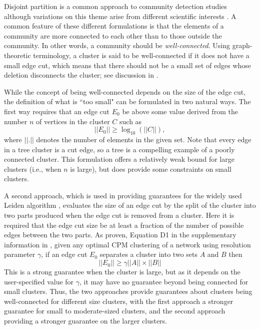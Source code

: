 \documentclass[12pt, oneside]{article}   	%
\begin{document}
Disjoint partition is a  common approach to community detection studies \citep{Fortunato2022,Fortunato2010} although variations on this theme arise from different scientific interests \citep{Coscia2011,Schaub2017}. 
A common feature of these different formulations is that  the elements of a community are more connected to each other than to those outside the community. In other words, a community 
should be {\em well-connected}. Using graph-theoretic terminology, a cluster is said to be well-connected if it does not have a small edge cut, which means that there should not be a small set of edges whose deletion 
disconnects the cluster; see discussion in \cite{Traag_2019}. 

While the concept of being well-connected depends on the size of the edge cut, the definition of what is ``too small" can be formulated in two
natural ways.
The first way
requires that an edge cut  $E_0$ be above some value derived from the number $n$ of 
vertices in the cluster $C$ such as $$||E_0|| \geq \log_{10}(||C||),$$    where $||.||$ denotes the number of elements in the given set.
Note that every edge in  a tree cluster is a cut edge, so a tree is  a compelling example of a poorly connected cluster. 
This formulation offers a relatively weak bound for large clusters (i.e., when   $n$ is large), but does provide some constraints on small clusters. 

A second approach, which is used in providing guarantees for the widely used Leiden algorithm \citep{Traag_2019}, evaluates the size of an edge cut by the split  of the cluster into two parts produced 
when the edge cut is removed from a cluster. Here it is required that the edge cut size be at least a fraction of the number of possible edges between the two  parts.
As proven, Equation D1 in the supplementary information in \cite{Traag_2019}, given any optimal CPM clustering of a network using resolution parameter $\gamma$, if an edge cut $E_0$
separates a cluster into two sets $A$ and $B$ then $$||E_0|| \geq \gamma ||A|| \times ||B||$$ This is a strong guarantee when the cluster is large,  but as it depends on the user-specified value for $\gamma$, it 
may have no guarantee  beyond being connected for small clusters. Thus, the two approaches provide guarantees about clusters being well-connected for different size clusters, with the first approach a stronger 
guarantee for small to moderate-sized clusters, and the second approach providing a stronger guarantee on the larger clusters.
\end{document}
